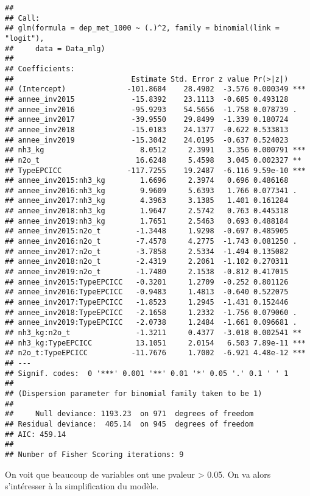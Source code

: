 \documentclass[
]{article}
\begin{document}
\begin{verbatim}
## 
## Call:
## glm(formula = dep_met_1000 ~ (.)^2, family = binomial(link = "logit"), 
##     data = Data_mlg)
## 
## Coefficients:
##                           Estimate Std. Error z value Pr(>|z|)    
## (Intercept)              -101.8684    28.4902  -3.576 0.000349 ***
## annee_inv2015             -15.8392    23.1113  -0.685 0.493128    
## annee_inv2016             -95.9293    54.5656  -1.758 0.078739 .  
## annee_inv2017             -39.9550    29.8499  -1.339 0.180724    
## annee_inv2018             -15.0183    24.1377  -0.622 0.533813    
## annee_inv2019             -15.3042    24.0195  -0.637 0.524023    
## nh3_kg                      8.0512     2.3991   3.356 0.000791 ***
## n2o_t                      16.6248     5.4598   3.045 0.002327 ** 
## TypeEPCICC               -117.7255    19.2487  -6.116 9.59e-10 ***
## annee_inv2015:nh3_kg        1.6696     2.3974   0.696 0.486168    
## annee_inv2016:nh3_kg        9.9609     5.6393   1.766 0.077341 .  
## annee_inv2017:nh3_kg        4.3963     3.1385   1.401 0.161284    
## annee_inv2018:nh3_kg        1.9647     2.5742   0.763 0.445318    
## annee_inv2019:nh3_kg        1.7651     2.5463   0.693 0.488184    
## annee_inv2015:n2o_t        -1.3448     1.9298  -0.697 0.485905    
## annee_inv2016:n2o_t        -7.4578     4.2775  -1.743 0.081250 .  
## annee_inv2017:n2o_t        -3.7858     2.5334  -1.494 0.135082    
## annee_inv2018:n2o_t        -2.4319     2.2061  -1.102 0.270311    
## annee_inv2019:n2o_t        -1.7480     2.1538  -0.812 0.417015    
## annee_inv2015:TypeEPCICC   -0.3201     1.2709  -0.252 0.801126    
## annee_inv2016:TypeEPCICC   -0.9483     1.4813  -0.640 0.522075    
## annee_inv2017:TypeEPCICC   -1.8523     1.2945  -1.431 0.152446    
## annee_inv2018:TypeEPCICC   -2.1658     1.2332  -1.756 0.079060 .  
## annee_inv2019:TypeEPCICC   -2.0738     1.2484  -1.661 0.096681 .  
## nh3_kg:n2o_t               -1.3211     0.4377  -3.018 0.002541 ** 
## nh3_kg:TypeEPCICC          13.1051     2.0154   6.503 7.89e-11 ***
## n2o_t:TypeEPCICC          -11.7676     1.7002  -6.921 4.48e-12 ***
## ---
## Signif. codes:  0 '***' 0.001 '**' 0.01 '*' 0.05 '.' 0.1 ' ' 1
## 
## (Dispersion parameter for binomial family taken to be 1)
## 
##     Null deviance: 1193.23  on 971  degrees of freedom
## Residual deviance:  405.14  on 945  degrees of freedom
## AIC: 459.14
## 
## Number of Fisher Scoring iterations: 9
\end{verbatim}

On voit que beaucoup de variables ont une pvaleur \textgreater{} 0.05.
On va alors s'intéresser à la simplification du modèle.
\end{document}
